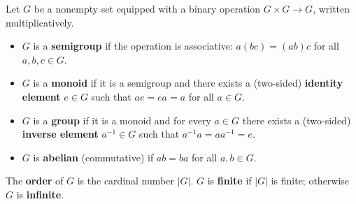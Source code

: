 Let $G$ be a nonempty set equipped with a binary operation $G \times G \to G$, written multiplicatively.

\begin{itemize}
\item $G$ is a \textbf{semigroup} if the operation is associative:
  $a(bc) = (ab)c$ for all $a,b,c \in G$.
\item $G$ is a \textbf{monoid} if it is a semigroup and there exists a (two-sided)
  \textbf{identity element} $e \in G$ such that $ae = ea = a$ for all $a \in G$.
\item $G$ is a \textbf{group} if it is a monoid and for every $a \in G$ there exists a
  (two-sided) \textbf{inverse element} $a^{-1} \in G$ such that
  $a^{-1}a = aa^{-1} = e$.
\item $G$ is \textbf{abelian} (commutative) if $ab = ba$ for all $a,b \in G$.
\end{itemize}

The \textbf{order} of $G$ is the cardinal number $|G|$. $G$ is \textbf{finite} if $|G|$ is
finite; otherwise $G$ is \textbf{infinite}.
